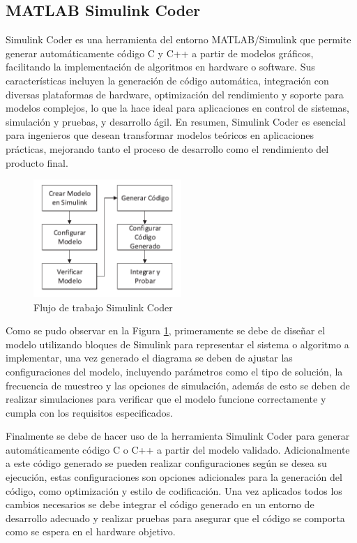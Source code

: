 \subsection{MATLAB Simulink Coder}

Simulink Coder es una herramienta del entorno MATLAB/Simulink que permite generar automáticamente código C y C++ a partir de modelos gráficos, facilitando la implementación de algoritmos en hardware o software. Sus características incluyen la generación de código automática, integración con diversas plataformas de hardware, optimización del rendimiento y soporte para modelos complejos, lo que la hace ideal para aplicaciones en control de sistemas, simulación y pruebas, y desarrollo ágil. En resumen, Simulink Coder es esencial para ingenieros que desean transformar modelos teóricos en aplicaciones prácticas, mejorando tanto el proceso de desarrollo como el rendimiento del producto final.
\newpage

\begin{figure}[h!]
    \centering
    \includegraphics[width=0.5\textwidth]{fig/teorico/Flujo de trabajo simulink coder.pdf}
    \caption{Flujo de trabajo Simulink Coder}
    \label{fig:Simulink_coder_workflow}
\end{figure}

Como se pudo observar en la Figura \ref{fig:Simulink_coder_workflow}, primeramente se debe de diseñar el modelo utilizando bloques de Simulink para representar el sistema o algoritmo a implementar, una vez generado el diagrama se deben de ajustar las configuraciones del modelo, incluyendo parámetros como el tipo de solución, la frecuencia de muestreo y las opciones de simulación, además de esto se deben de realizar simulaciones para verificar que el modelo funcione correctamente y cumpla con los requisitos especificados. 

Finalmente se debe de hacer uso de la herramienta Simulink Coder para generar automáticamente código C o C++ a partir del modelo validado. Adicionalmente a este código generado se pueden realizar configuraciones según se desea su ejecución, estas configuraciones son opciones adicionales para la generación del código, como optimización y estilo de codificación. Una vez aplicados todos los cambios necesarios se debe integrar el código generado en un entorno de desarrollo adecuado y realizar pruebas para asegurar que el código se comporta como se espera en el hardware objetivo.

